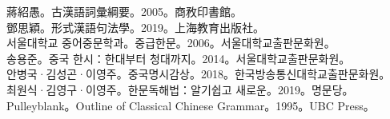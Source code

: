 蔣紹愚。古漢語詞彙綱要。2005。商敄印書館。\\
鄧思穎。形式漢語句法學。2019。上海教育出版社。\\
서울대학교 중어중문학과。중급한문。2006。서울대학교출판문화원。\\
송용준。중국 한시：한대부터 청대까지。2014。서울대학교출판문화원。\\ 
안병국·김성곤·이영주。중국명시감상。2018。한국방송통신대학교출판문화원。\\
최원식·김영구·이영주。한문독해법：알기쉽고 새로운。2019。명문당。\\
Pulleyblank。Outline of Classical Chinese Grammar。1995。UBC Press。\\
